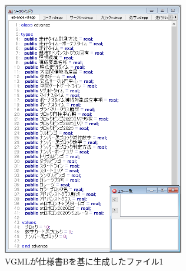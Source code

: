 \begin{figure}[p]
    \begin{center}
    \includegraphics[width=300]{image/indicationB_vdm1.PNG}
    \caption{VGMLが仕様書Bを基に生成したファイル1}
    \label{fig:indicationB_vdm1}
    \end{center}
\end{figure}

